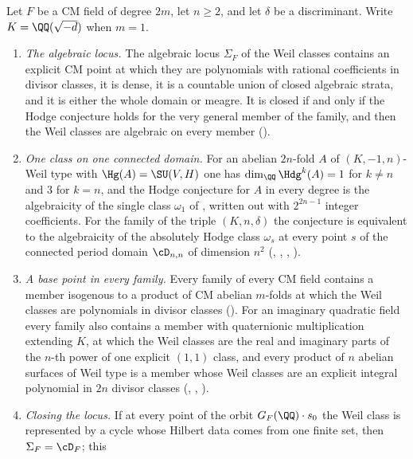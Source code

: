 \begin{theorem}[Closure]\label{thm:final}
Let $F$ be a CM field of degree $2m$, let $n\ge2$, and let $\delta$ be a
discriminant. Write $K=\QQ(\sqrt{-d})$ when $m=1$.
\begin{enumerate}[label=\textup{(\roman*)},leftmargin=2.8em,itemsep=4pt]
\item \emph{The algebraic locus.} The algebraic locus $\Sigma_{F}$ of the Weil
  classes contains an explicit CM point at which they are polynomials with
  rational coefficients in divisor classes, it is dense, it is a countable
  union of closed algebraic strata, and it is either the whole domain or
  meagre. It is closed if and only if the Hodge conjecture holds for the very
  general member of the family, and then the Weil classes are algebraic on
  every member (\cite[Theorem~1.1]{paperI}).
\item \emph{One class on one connected domain.} For an abelian $2n$-fold $A$ of
  $(K,-1,n)$-Weil type with $\Hg(A)=\SU(V,H)$ one has
  $\dim_{\QQ}\Hdg^{k}(A)=1$ for $k\ne n$ and $3$ for $k=n$, and the Hodge
  conjecture for $A$ in every degree is the algebraicity of the single class
  $\omega_{1}$ of \cite[(11)]{paperI}, written out with $2^{2n-1}$ integer
  coefficients. For the family of the triple $(K,n,\delta)$ the conjecture is
  equivalent to the algebraicity of the absolutely Hodge class $\omega_{s}$ at
  every point $s$ of the connected period domain $\cD_{n,n}$ of dimension
  $n^{2}$ (\cite[Theorem~4.14]{paperI}, \cite[Corollary~4.15]{paperI}, \cite[Theorem~15.14]{paperI},
  \cite[Corollary~15.35]{paperI}).
\item \emph{A base point in every family.} Every family of every CM field
  contains a member isogenous to a product of CM abelian $m$-folds at which
  the Weil classes are polynomials in divisor classes
  (\cite[Theorem~17.5]{paperI}). For an imaginary quadratic field every family also
  contains a member with quaternionic multiplication extending $K$, at which
  the Weil classes are the real and imaginary parts of the $n$-th power of one
  explicit $(1,1)$ class, and every product of $n$ abelian surfaces of Weil
  type is a member whose Weil classes are an explicit integral polynomial in
  $2n$ divisor classes (\cite[Theorem~15.25]{paperI}, \cite[Theorem~15.27]{paperI},
  \cite[Theorem~15.10]{paperI}).
\item \emph{Closing the locus.} If at every point of the orbit
  $G_{F}(\QQ)\cdot s_{0}$ the Weil class is represented by a cycle whose
  Hilbert data comes from one finite set, then $\Sigma_{F}=\cD_{F}$; this

\end{enumerate}
\end{theorem}
